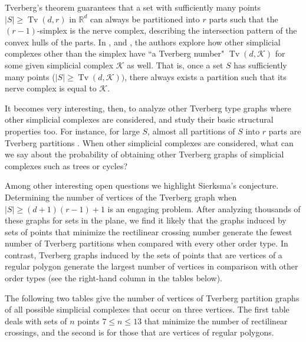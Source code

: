 \documentclass[11pt,a4paper]{article}
\theoremstyle{plain}
\theoremstyle{definition}
\newcommand{\rr}{\mathds{R}}
\newcommand{\tv}{\operatorname{Tv}}
\begin{document}
Tverberg's theorem guarantees that a set with sufficiently many points $|S|\geq \tv(d,r)$ in
$\rr^d$ can always be partitioned into $r$ parts such that the $(r-1)$-simplex is the nerve complex, describing the intersection pattern of the convex hulls of the parts. In \cite{TverbergTypeTheorems}, \cite{TonoDeb} and \cite{florianyAmsi}, the authors explore 
how other simplicial complexes other than the simplex have ``a Tverberg number" $\tv(d,\mathcal{K})$ for some given simplicial complex $\mathcal{K}$ as well. That is, once a set $S$ has sufficiently many points ($|S|\geq \tv(d,\mathcal{K}))$, there always exists a partition such that its nerve complex is equal to $\mathcal{K}$.  

It becomes very interesting, then, to analyze other Tverberg type graphs where other simplicial complexes are considered, and study their basic structural properties too. For instance, for large $S$, almost all partitions of $S$ into $r$ parts are Tverberg partitions \cite{Soberon:2018gn}. When other simplicial complexes are considered, what can we say about the probability of obtaining other Tverberg graphs of simplicial complexes such as trees or cycles?

Among other interesting open questions we highlight Sierksma's conjecture.  Determining the number of vertices of the Tverberg graph when $|S|\geq (d+1)(r-1)+1$ is an engaging problem. After analyzing thousands of these graphs for sets in the plane, we find it likely that the graphs induced by sets of points that minimize the rectilinear crossing number generate the fewest number of Tverberg partitions when compared with every other order type. In contrast, Tverberg graphs induced by the sets of points that are vertices of a regular polygon generate the largest number of vertices in comparison with other order types (see the right-hand column in the tables below).

The following two tables give the number of vertices of Tverberg partition graphs of all possible simplicial complexes that occur on three vertices. The first table deals with sets of $n$ points $7\leq n\leq 13$ that minimize the number of rectilinear crossings, and the second is for those that are vertices of regular polygons. 



\end{document}

